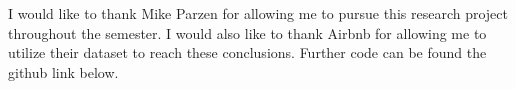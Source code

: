 \documentclass[twocolumn,10pt]{asme2ej}
\begin{document}
\begin{acknowledgment}
I would like to thank Mike Parzen for allowing me to pursue this research project throughout the semester. I would also like to thank Airbnb for allowing me to utilize their dataset to reach these conclusions. Further code can be found the github link below.
\end{acknowledgment}

%





\end{document}
